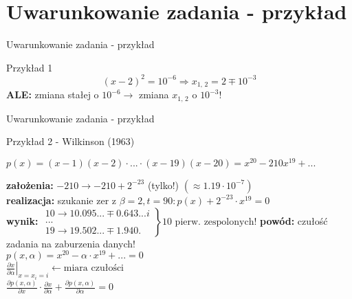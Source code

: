 \section{Uwarunkowanie zadania - przykład}
\begin{frame}{Uwarunkowanie zadania - przykład}
	\begin{exampleblock}{Przykład 1}
    	\[
        	(x-2)^2 = 10^{-6} \Rightarrow x_\text{1, 2} = 2 \mp 10^{-3}
        \]
        {\bf ALE:} zmiana stałej o $10^{-6} \rightarrow$ zmiana $x_\text{1, 2}$ o $10^{-3}$!
    \end{exampleblock}
\end{frame}
\begin{frame}{Uwarunkowanie zadania - przykład}
	\begin{exampleblock}{Przykład 2 - Wilkinson (1963)}
    
    	\vspace{.1cm}
        \(
        	p(x) = (x-1)(x-2) \cdot ... \cdot (x-19)(x-20) = x^{20} - 210x^{19} + ...
        \) \vspace{.2cm}
        
        {\bf założenia:} $-210 \to -210 +2^{-23}$ (tylko!) $(\approx 1.19 \cdot 10^{-7})$ \\
        {\bf realizacja:} szukanie zer z $\beta = 2, t = 90: p(x) + 2^{-23} \cdot x^{19} = 0$ \\
        {\bf wynik:} \(
            \left.
            	\begin{array}{ll}
                10 \to 10.095 ... \mp 0.643...i \\
                ... \\
                19 \to 19.502 ... \mp 1.940 .
                \end{array}
            \right\rbrace \text{10 pierw. zespolonych!}
        \)
        {\bf powód:} czułość zadania na zaburzenia danych! \\
        
        \centering
        \(
            p(x,\alpha) = x^{20} - \alpha \cdot x^{19} + ... = 0
        \) \\ \vspace{.1cm}
        \(
            \left.
            \frac{ 
                \partial x
            }{
                \partial \alpha
            } 
            \right|_{x=x_i=i}
            \leftarrow \text{miara czułości}
        \) \\ \vspace{.1cm}
        \(
        	\frac{
            	\partial p(x,\alpha)
            }{
            	\partial x
            } \cdot \frac{
            	\partial x
            }{
            	\partial \alpha
            } + \frac{
            	\partial p(x, \alpha)
            }{
            	\partial \alpha
            } = 0
        \)
	\end{exampleblock}
\end{frame}
